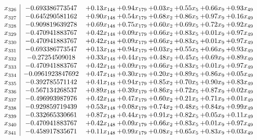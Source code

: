\documentclass[8pt]{article}
\begin{document}
\[\begin{array}{c| c c@{\hskip 2pt} c@{\hskip 2pt} c@{\hskip 2pt} c@{\hskip 2pt} c@{\hskip 2pt} c@{\hskip 2pt} }
 x_{326}   &  -0.693386773547 & +  0.13 x_{148} & +  0.94 x_{179} & +  0.03 x_{2} & +  0.55 x_{5} & +  0.66 x_{9} & +  0.93 x_{49}\\
 x_{327}   &  -0.645290581162 & +  0.90 x_{148} & +  0.54 x_{179} & +  0.68 x_{2} & +  0.86 x_{5} & +  0.97 x_{9} & +  0.16 x_{49}\\
 x_{328}   &  -0.909819639278 & +  0.69 x_{148} & +  0.75 x_{179} & +  0.60 x_{2} & +  0.69 x_{5} & +  0.72 x_{9} & +  0.92 x_{49}\\
 x_{329}   &  -0.470941883767 & +  0.42 x_{148} & +  0.09 x_{179} & +  0.66 x_{2} & +  0.83 x_{5} & +  0.01 x_{9} & +  0.97 x_{49}\\
 x_{330}   &  -0.470941883767 & +  0.42 x_{148} & +  0.09 x_{179} & +  0.66 x_{2} & +  0.83 x_{5} & +  0.01 x_{9} & +  0.97 x_{49}\\
 x_{331}   &  -0.693386773547 & +  0.13 x_{148} & +  0.94 x_{179} & +  0.03 x_{2} & +  0.55 x_{5} & +  0.66 x_{9} & +  0.93 x_{49}\\
 x_{332}   &  -0.27254509018 & +  0.33 x_{148} & +  0.44 x_{179} & +  0.48 x_{2} & +  0.45 x_{5} & +  0.69 x_{9} & +  0.89 x_{49}\\
 x_{333}   &  -0.470941883767 & +  0.42 x_{148} & +  0.09 x_{179} & +  0.66 x_{2} & +  0.83 x_{5} & +  0.01 x_{9} & +  0.97 x_{49}\\
 x_{334}   &  -0.0961923847692 & +  0.47 x_{148} & +  0.30 x_{179} & +  0.20 x_{2} & +  0.89 x_{5} & +  0.86 x_{9} & +  0.05 x_{49}\\
 x_{335}   &  -0.392785571142 & +  0.41 x_{148} & +  0.94 x_{179} & +  0.85 x_{2} & +  0.70 x_{5} & +  0.90 x_{9} & +  0.83 x_{49}\\
 x_{336}   &  -0.567134268537 & +  0.89 x_{148} & +  0.39 x_{179} & +  0.86 x_{2} & +  0.72 x_{5} & +  0.87 x_{9} & +  0.02 x_{49}\\
 x_{337}   &  -0.496993987976 & +  0.42 x_{148} & +  0.47 x_{179} & +  0.60 x_{2} & +  0.21 x_{5} & +  0.71 x_{9} & +  0.01 x_{49}\\
 x_{338}   &  -0.929859719439 & +  0.53 x_{148} & +  0.08 x_{179} & +  0.74 x_{2} & +  0.48 x_{5} & +  0.84 x_{9} & +  0.99 x_{49}\\
 x_{339}   &  -0.332665330661 & +  0.87 x_{148} & +  0.44 x_{179} & +  0.91 x_{2} & +  0.82 x_{5} & +  0.05 x_{9} & +  0.11 x_{49}\\
 x_{340}   &  -0.470941883767 & +  0.42 x_{148} & +  0.09 x_{179} & +  0.66 x_{2} & +  0.83 x_{5} & +  0.01 x_{9} & +  0.97 x_{49}\\
 x_{341}   &  -0.458917835671 & +  0.11 x_{148} & +  0.99 x_{179} & +  0.08 x_{2} & +  0.65 x_{5} & +  0.83 x_{9} & +  0.03 x_{49}\\

\end{array}\]
\end{document}
